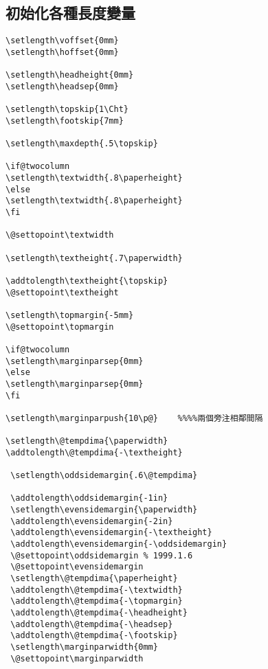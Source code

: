 \subsection{初始化各種長度變量}

\begin{lstlisting}[firstnumber=188]
\setlength\voffset{0mm}
\setlength\hoffset{0mm}

\setlength\headheight{0mm}
\setlength\headsep{0mm}

\setlength\topskip{1\Cht}
\setlength\footskip{7mm}

\setlength\maxdepth{.5\topskip}

\if@twocolumn
\setlength\textwidth{.8\paperheight}
\else
\setlength\textwidth{.8\paperheight}
\fi

\@settopoint\textwidth

\setlength\textheight{.7\paperwidth}

\addtolength\textheight{\topskip}
\@settopoint\textheight

\setlength\topmargin{-5mm}
\@settopoint\topmargin

\if@twocolumn
\setlength\marginparsep{0mm}
\else
\setlength\marginparsep{0mm}
\fi

\setlength\marginparpush{10\p@}    %%%%兩個旁注相鄰間隔

\setlength\@tempdima{\paperwidth}
\addtolength\@tempdima{-\textheight}

 \setlength\oddsidemargin{.6\@tempdima}

 \addtolength\oddsidemargin{-1in}
 \setlength\evensidemargin{\paperwidth}
 \addtolength\evensidemargin{-2in}
 \addtolength\evensidemargin{-\textheight}
 \addtolength\evensidemargin{-\oddsidemargin}
 \@settopoint\oddsidemargin % 1999.1.6
 \@settopoint\evensidemargin
 \setlength\@tempdima{\paperheight}
 \addtolength\@tempdima{-\textwidth}
 \addtolength\@tempdima{-\topmargin}
 \addtolength\@tempdima{-\headheight}
 \addtolength\@tempdima{-\headsep}
 \addtolength\@tempdima{-\footskip}
 \setlength\marginparwidth{0mm}
 \@settopoint\marginparwidth


\end{lstlisting}

